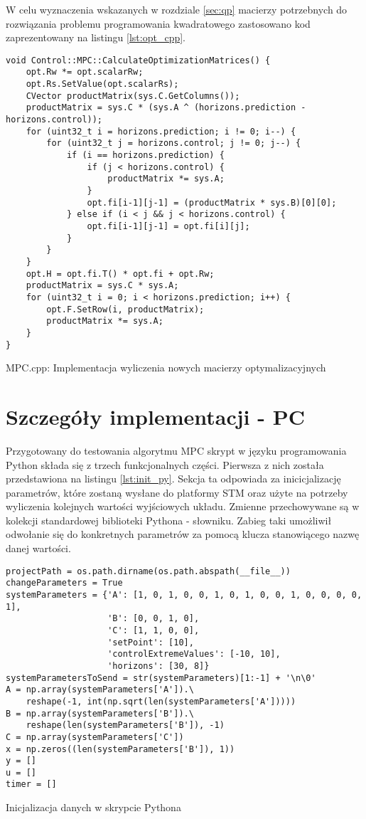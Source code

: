 W celu wyznaczenia wskazanych w rozdziale \ref{sec:qp} macierzy potrzebnych do rozwiązania
problemu programowania kwadratowego zastosowano kod zaprezentowany na listingu \ref{lst:opt_cpp}.
\begin{listing}[htb]
\begin{verbatim}
void Control::MPC::CalculateOptimizationMatrices() {
    opt.Rw *= opt.scalarRw;
    opt.Rs.SetValue(opt.scalarRs);
    CVector productMatrix(sys.C.GetColumns());
    productMatrix = sys.C * (sys.A ^ (horizons.prediction - horizons.control));
    for (uint32_t i = horizons.prediction; i != 0; i--) {
        for (uint32_t j = horizons.control; j != 0; j--) {
            if (i == horizons.prediction) {
                if (j < horizons.control) {
                    productMatrix *= sys.A;
                }
                opt.fi[i-1][j-1] = (productMatrix * sys.B)[0][0];
            } else if (i < j && j < horizons.control) {
                opt.fi[i-1][j-1] = opt.fi[i][j];
            }
        }
    }
    opt.H = opt.fi.T() * opt.fi + opt.Rw;
    productMatrix = sys.C * sys.A;
    for (uint32_t i = 0; i < horizons.prediction; i++) {
        opt.F.SetRow(i, productMatrix);
        productMatrix *= sys.A;
    }
}
\end{verbatim}
\caption{MPC.cpp: Implementacja wyliczenia nowych macierzy optymalizacyjnych}
\label{lst:opt_cpp}
\end{listing}

\section{Szczegóły implementacji - PC} \label{sec:details-pc}
Przygotowany do testowania algorytmu MPC skrypt w języku programowania Python składa się z trzech
funkcjonalnych części. Pierwsza z nich została przedstawiona na listingu \ref{lst:init_py}. Sekcja
ta odpowiada za inicicjalizację parametrów, które zostaną wysłane do platformy STM oraz użyte
na potrzeby wyliczenia kolejnych wartości wyjściowych układu. Zmienne przechowywane są w kolekcji
standardowej biblioteki Pythona - słowniku. Zabieg taki umożliwił odwołanie się do konkretnych
parametrów za pomocą klucza stanowiącego nazwę danej wartości. 

\begin{listing}[htb]
\begin{verbatim}
projectPath = os.path.dirname(os.path.abspath(__file__))
changeParameters = True
systemParameters = {'A': [1, 0, 1, 0, 0, 1, 0, 1, 0, 0, 1, 0, 0, 0, 0, 1],
                    'B': [0, 0, 1, 0],
                    'C': [1, 1, 0, 0],
                    'setPoint': [10],
                    'controlExtremeValues': [-10, 10],
                    'horizons': [30, 8]}
systemParametersToSend = str(systemParameters)[1:-1] + '\n\0'
A = np.array(systemParameters['A']).\
    reshape(-1, int(np.sqrt(len(systemParameters['A']))))
B = np.array(systemParameters['B']).\
    reshape(len(systemParameters['B']), -1)
C = np.array(systemParameters['C'])
x = np.zeros((len(systemParameters['B']), 1))
y = []
u = []
timer = []
\end{verbatim}
\caption{Inicjalizacja danych w skrypcie Pythona}
\label{lst:init_py}
\end{listing}


